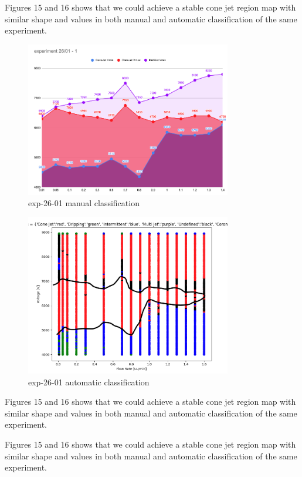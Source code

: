 Figures 15 and 16 shows that we could achieve a stable cone jet region map with similar shape and values in both manual and automatic classification of the same experiment.

\begin{multicols}{2}


    \begin{figure}[H]
        \center
        \includegraphics[width=9cm]{Figuras/report3/manual-mapping.png}
        \caption{ exp-26-01 manual classification}
    \end{figure}

    \begin{figure}[H]
        \center
        \includegraphics[width=9cm]{Figuras/report3/map4-stabilityIsland.png}
        \caption{ exp-26-01 automatic classification}
    \end{figure}

\end{multicols}

Figures 15 and 16 shows that we could achieve a stable cone jet region map with similar shape and values in both manual and automatic classification of the same experiment.

Figures 15 and 16 shows that we could achieve a stable cone jet region map with similar shape and values in both manual and automatic classification of the same experiment.


